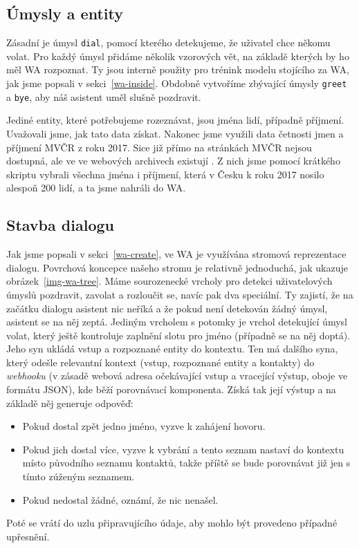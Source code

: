 \subsection{Úmysly a entity}\label{intents-entities}

Zásadní je úmysl
\texttt{dial}, pomocí kterého detekujeme, že uživatel chce někomu volat. Pro
každý úmysl přidáme několik vzorových vět, na základě kterých by ho měl WA
rozpoznat. Ty jsou interně použity pro trénink modelu stojícího za WA, jak
jsme popsali v sekci~\ref{wa-inside}.
Obdobně vytvoříme zbývající úmysly \texttt{greet} a \texttt{bye}, aby náš
asistent uměl slušně pozdravit.

Jediné entity, které potřebujeme rozeznávat, jsou jména lidí, případně příjmení.
Uvažovali jsme, jak tato
data získat. Nakonec jsme využili data četnosti jmen a příjmení MVČR z roku 2017.
Sice již přímo na stránkách MVČR nejsou dostupná, ale ve ve webových archivech
existují \citep{mvcr_cetnost_2018}. Z nich jsme pomocí krátkého skriptu vybrali
všechna jména i příjmení, která v Česku k roku 2017 nosilo alespoň
200 lidí, a ta jsme nahráli do WA.

\subsection{Stavba dialogu}\label{building-dialog}

Jak jsme popsali v sekci~\ref{wa-create}, ve WA je využívána stromová reprezentace dialogu.
Povrchová koncepce našeho stromu je relativně jednoduchá, jak ukazuje obrázek~\ref{img-wa-tree}.
Máme sourozenecké
vrcholy pro detekci uživatelových úmyslů pozdravit, zavolat a rozloučit se, navíc
pak dva speciální. Ty zajistí, že na začátku dialogu asistent nic neříká a že
pokud není detekován žádný úmysl, asistent se na něj zeptá. Jediným vrcholem
s potomky je vrchol detekující úmysl volat, který ještě kontroluje zaplnění slotu
pro jméno (případně se na něj doptá). Jeho syn ukládá vstup a rozpoznané entity
do kontextu. Ten
má dalšího syna, který odešle relevantní kontext (vstup, rozpoznané entity a kontakty)
do \textit{webhooku} (v zásadě webová adresa očekávající vstup a vracející
výstup, oboje ve formátu JSON), kde běží porovnávací komponenta. Získá tak její
výstup a na základě něj generuje odpověď:
\begin{itemize}
    \item Pokud dostal zpět jedno jméno, vyzve k zahájení hovoru.
    \item Pokud jich dostal více, vyzve k vybrání a tento seznam nastaví do kontextu místo původního
          seznamu kontaktů, takže příště se bude porovnávat již jen s tímto zúženým seznamem.
    \item Pokud nedostal žádné, oznámí, že nic nenašel.
\end{itemize}
Poté se vrátí do uzlu připravujícího údaje, aby mohlo být provedeno případné
upřesnění.

